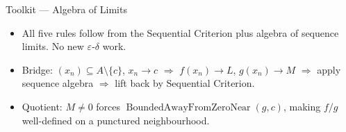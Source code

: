 \begin{toolkitbox}{Toolkit --- Algebra of Limits}
\begin{itemize}
  \item All five rules follow from the Sequential Criterion plus
    algebra of sequence limits. No new $\varepsilon$-$\delta$ work.
  \item Bridge: $(x_n)\subseteq A\setminus\{c\}$, $x_n\to c$
    $\Rightarrow$ $f(x_n)\to L$, $g(x_n)\to M$
    $\Rightarrow$ apply sequence algebra
    $\Rightarrow$ lift back by Sequential Criterion.
  \item Quotient: $M\neq 0$ forces $\operatorname{BoundedAwayFromZeroNear}(g,c)$,
    making $f/g$ well-defined on a punctured neighbourhood.
\end{itemize}
\end{toolkitbox}





